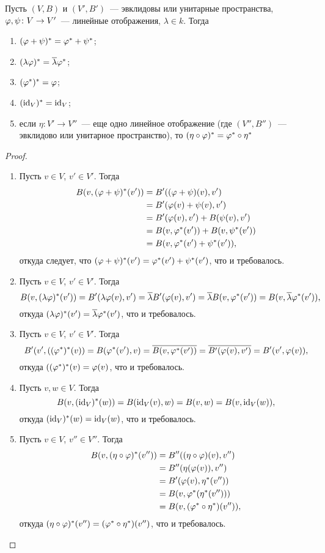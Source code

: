 \begin{proposition}
Пусть $(V,B)$ и $(V',B')$~--- эвклидовы или унитарные пространства,
$\varphi,\psi\colon V\to V'$~--- линейные отображения,
$\lambda\in k$. Тогда
\begin{enumerate}
\item $(\varphi+\psi)^* = \varphi^*+\psi^*$;
\item $(\lambda\varphi)^* = \overline\lambda\varphi^*$;
\item $(\varphi^*)^* = \varphi$;
\item $(\operatorname{id}_V)^* = \operatorname{id}_V$;
\item если $\eta\colon V'\to V''$~--- еще одно линейное отображение
(где $(V'',B'')$~--- эвклидово или унитарное пространство), то
$(\eta\circ\varphi)^* = \varphi^*\circ\eta^*$
\end{enumerate}
\end{proposition}
\begin{proof}
\begin{enumerate}
\item Пусть $v\in V$, $v'\in V'$. Тогда
\begin{align*}
B(v,(\varphi+\psi)^*(v')) &= B'((\varphi+\psi)(v),v') \\
&= B'(\varphi(v) + \psi(v),v') \\
&= B'(\varphi(v),v') + B(\psi(v),v') \\
&= B(v,\varphi^*(v')) + B(v,\psi^*(v')) \\
&= B(v,\varphi^*(v')+\psi^*(v')),
\end{align*}
откуда следует, что $(\varphi+\psi)^*(v') = \varphi^*(v') + \psi^*(v')$,
что и требовалось.
\item Пусть $v\in V$, $v'\in V'$. Тогда
$$
B(v,(\lambda\varphi)^*(v')) = B'(\lambda\varphi(v),v') =
\overline\lambda B'(\varphi(v),v') = \overline\lambda B(v,\varphi^*(v')) = 
B(v,\overline\lambda\varphi^*(v')),
$$
откуда $(\lambda\varphi)^*(v') = \overline\lambda\varphi^*(v')$, что и требовалось.
\item Пусть $v\in V$, $v'\in V'$. Тогда
$$
B'(v',((\varphi^*)^*(v)) = B(\varphi^*(v'),v) = \overline{B(v,\varphi^*(v'))}
=\overline{B'(\varphi(v),v')} = B'(v',\varphi(v)),
$$
откуда $((\varphi^*)^*(v) = \varphi(v)$, что и требовалось.
\item Пусть $v,w\in V$. Тогда
$$
B(v,(\operatorname{id}_V)^*(w)) = B(\operatorname{id}_V(v),w) = B(v,w) = B(v,\operatorname{id}_V(w)),
$$
откуда $(\operatorname{id}_V)^*(w) = \operatorname{id}_V(w)$, что и требовалось.
\item Пусть $v\in V$, $v''\in V''$. Тогда
\begin{align*}
B(v,(\eta\circ\varphi)^*(v'')) &= B''((\eta\circ\varphi)(v),v'') \\
&= B''(\eta(\varphi(v)),v'') \\
&= B'(\varphi(v),\eta^*(v'')) \\
&= B(v,\varphi^*(\eta^*(v''))) \\
&= B(v,(\varphi^*\circ\eta^*)(v'')),
\end{align*}
откуда $(\eta\circ\varphi)^*(v'') = (\varphi^*\circ\eta^*)(v'')$,
что и требовалось.
\end{enumerate}
\end{proof}

